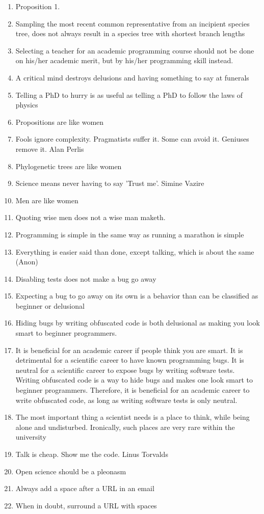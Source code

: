 \documentclass{dissertation}
\begin{document}
\begin{enumerate}

\item Proposition 1.
\item Sampling the most recent common representative from an incipient
  species tree, does not always result in a species tree with shortest
  branch lengths
\item Selecting a teacher for an academic programming course should not be done on his/her academic merit, but by his/her programming skill instead.
\item A critical mind destroys delusions and having something to say at funerals
\item Telling a PhD to hurry is as useful as telling a PhD to follow the laws of physics
\item Propositions are like women
\item Fools ignore complexity. Pragmatists suffer it. Some can avoid it. Geniuses remove it. Alan Perlis
\item Phylogenetic trees are like women
\item Science means never having to say 'Trust me'. Simine Vazire 
\item Men are like women
\item Quoting wise men does not a wise man maketh.
\item Programming is simple in the same way as running a marathon is simple
\item Everything is easier said than done, except talking, which is about the same (Anon)
\item Disabling tests does not make a bug go away
\item Expecting a bug to go away on its own is a behavior than can be classified as beginner or delusional
\item Hiding bugs by writing obfuscated code is both delusional as making you look smart to beginner programmers. 
\item It is beneficial for an academic career if people think you are smart.
      It is detrimental for a scientific career to have known programming bugs.
      It is neutral for a scientific career to expose bugs by writing software tests.
      Writing obfuscated code is a way to hide bugs and makes one look smart to beginner programmers.
      Therefore, it is beneficial for an academic career to write obfuscated code,
      as long as writing software tests is only neutral.
\item The most important thing a scientist needs is a place to think, while
      being alone and undisturbed. Ironically, such places are very rare
      within the university
\item Talk is cheap. Show me the code. Linus Torvalds
\item Open science should be a pleonasm
\item Always add a space after a URL in an email
\item When in doubt, surround a URL with spaces

\end{enumerate}
\end{document}
